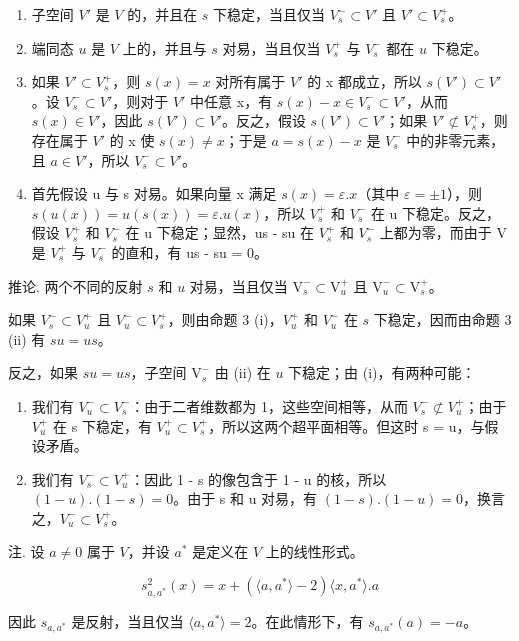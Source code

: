 \begin{enumerate}
\def\labelenumi{(\roman{enumi})}
\item
子空间 \(V'\) 是 \(V\) 的，并且在 \(s\) 下稳定，当且仅当 \(V_s^- \subset V'\) 且 \(V' \subset V_s^+\)。
\item
端同态 \(u\) 是 \(V\) 上的，并且与 \(s\) 对易，当且仅当 \(V_s^+\) 与 \(V_s^-\) 都在 \(u\) 下稳定。
\item
如果 \(V' \subset V_{s}^{+}\)，则 \(s(x) = x\) 对所有属于 \(V'\) 的 x 都成立，所以 \(s(V') \subset V'\)。设 \(V_{s}^{-} \subset V'\)，则对于 \(V'\) 中任意 x，有 \(s(x) - x \in V_{s}^{-} \subset V'\)，从而 \(s(x) \in V'\)，因此 \(s(V') \subset V'\)。反之，假设 \(s(V') \subset V'\)；如果 \(V' \not\subset V_{s}^{+}\)，则存在属于 \(V'\) 的 x 使 \(s(x) \neq x\)；于是 \(a = s(x) - x\) 是 \(V_{s}^{-}\) 中的非零元素，且 \(a \in V'\)，所以 \(V_{s}^{-} \subset V'\)。
\item
  首先假设 u 与 s 对易。如果向量 x 满足 \(s(x) = \varepsilon.x\)（其中 \(\varepsilon = \pm1\)），则 \(s(u(x)) = u(s(x)) = \varepsilon.u(x)\)，所以 \(V_{s}^{+}\) 和 \(V_{s}^{-}\) 在 u 下稳定。反之，假设 \(V_{s}^{+}\) 和 \(V_{s}^{-}\) 在 u 下稳定；显然，us - su 在 \(V_{s}^{+}\) 和 \(V_{s}^{-}\) 上都为零，而由于 V 是 \(V_{s}^{+}\) 与 \(V_{s}^{-}\) 的直和，有 us - su = 0。
\end{enumerate}

推论. 两个不同的反射 \(s\) 和 \(u\) 对易，当且仅当 \(\mathrm{V}_s^- \subset \mathrm{V}_u^+\) 且 \(\mathrm{V}_u^- \subset \mathrm{V}_s^+\)。

如果 \(V_{s}^{-} \subset V_{u}^{+}\) 且 \(V_{u}^{-} \subset V_{s}^{+}\)，则由命题 3 (i)，\(V_{u}^{+}\) 和 \(V_{u}^{-}\) 在 \(s\) 下稳定，因而由命题 3 (ii) 有 \(su = us\)。

反之，如果 \(su = us\)，子空间 \(\mathrm{V}_{s}^{-}\) 由 (ii) 在 \(u\) 下稳定；由 (i)，有两种可能：

\begin{enumerate}
\def\labelenumi{\alph{enumi})}
\item
  我们有 \(V_{u}^{-} \subset V_{s}^{-}\)：由于二者维数都为 1，这些空间相等，从而 \(V_{s}^{-} \not\subset V_{u}^{+}\)；由于 \(V_{u}^{+}\) 在 s 下稳定，有 \(V_{u}^{+} \subset V_{s}^{+}\)，所以这两个超平面相等。但这时 s = u，与假设矛盾。
\item
  我们有 \(V_{s}^{-} \subset V_{u}^{+}\)：因此 1 - s 的像包含于 1 - u 的核，所以 \((1 - u).(1 - s) = 0\)。由于 s 和 u 对易，有 \((1 - s).(1 - u) = 0\)，换言之，\(V_{u}^{-} \subset V_{s}^{+}\)。
\end{enumerate}

注. 设 \(a \neq 0\) 属于 \(V\)，并设 \(a^*\) 是定义在 \(V\) 上的线性形式。

\[
s _ {a, a ^ {*}} ^ {2} (x) = x + \left(\langle a, a ^ {*} \rangle - 2\right) \langle x, a ^ {*} \rangle . a
\]

因此 \(s_{a,a^*}\) 是反射，当且仅当 \(\langle a, a^* \rangle = 2\)。在此情形下，有 \(s_{a,a^*}(a) = -a\)。

